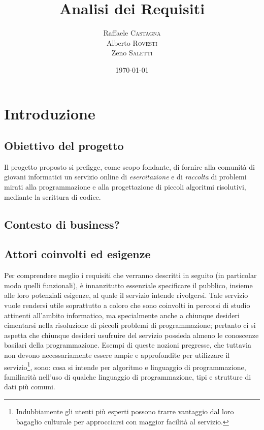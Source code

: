 \documentclass[11pt, a4paper]{article}
\title{Analisi dei Requisiti}
\author{Raffaele \textsc{Castagna}\\
Alberto \textsc{Rovesti}\\
Zeno \textsc{Saletti}}
\date{\today}
\theoremstyle{definition}
\begin{document}


\tableofcontents


\newpage
\section{Introduzione}


\subsection{Obiettivo del progetto}
Il progetto proposto si prefigge, come scopo fondante, di fornire alla comunità
di giovani informatici un servizio online di \textit{esercitazione} e di
\textit{raccolta} di problemi mirati alla programmazione e alla progettazione
di piccoli algoritmi risolutivi, mediante la scrittura di codice.

\subsection{Contesto di business?}

\subsection{Attori coinvolti ed esigenze}
Per comprendere meglio i requisiti che verranno descritti in seguito (in
particolar modo quelli funzionali), è innanzitutto essenziale specificare
il pubblico, insieme alle loro potenziali esigenze, al quale il servizio
intende rivolgersi.
Tale servizio vuole rendersi utile soprattutto a coloro che sono coinvolti
in percorsi di studio attinenti all'ambito informatico, ma specialmente anche
a chiunque desideri cimentarsi nella risoluzione di piccoli problemi di
programmazione; pertanto ci si aspetta che chiunque desideri usufruire del
servizio possieda almeno le conoscenze basilari della programmazione. Esempi
di queste nozioni pregresse, che tuttavia non devono necessariamente essere ampie e approfondite per utilizzare il servizio\footnote{Indubbiamente gli
utenti più esperti possono trarre vantaggio dal loro bagaglio culturale per
approcciarsi con maggior facilità al servizio.}, sono: cosa si intende per
algoritmo e linguaggio di programmazione, familiarità nell'uso di qualche
linguaggio di programmazione, tipi e strutture di dati più comuni.
\end{document}
